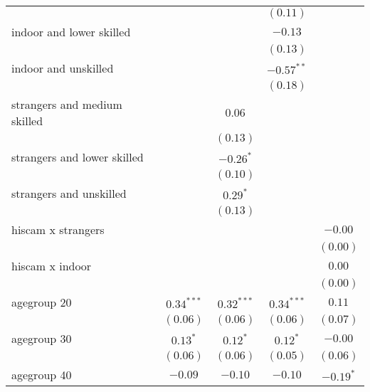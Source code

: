\begin{table}
\begin{center}
\begin{tabular}{l c c c c}
                             &               &               & $(0.11)$      &              \\
indoor and lower skilled     &               &               & $-0.13$       &              \\
                             &               &               & $(0.13)$      &              \\
indoor and unskilled         &               &               & $-0.57^{**}$  &              \\
                             &               &               & $(0.18)$      &              \\
strangers and medium skilled &               & $0.06$        &               &              \\
                             &               & $(0.13)$      &               &              \\
strangers and lower skilled  &               & $-0.26^{*}$   &               &              \\
                             &               & $(0.10)$      &               &              \\
strangers and unskilled      &               & $0.29^{*}$    &               &              \\
                             &               & $(0.13)$      &               &              \\
hiscam x strangers           &               &               &               & $-0.00$      \\
                             &               &               &               & $(0.00)$     \\
hiscam x indoor              &               &               &               & $0.00$       \\
                             &               &               &               & $(0.00)$     \\
agegroup 20                  & $0.34^{***}$  & $0.32^{***}$  & $0.34^{***}$  & $0.11$       \\
                             & $(0.06)$      & $(0.06)$      & $(0.06)$      & $(0.07)$     \\
agegroup 30                  & $0.13^{*}$    & $0.12^{*}$    & $0.12^{*}$    & $-0.00$      \\
                             & $(0.06)$      & $(0.06)$      & $(0.05)$      & $(0.06)$     \\
agegroup 40                  & $-0.09$       & $-0.10$       & $-0.10$       & $-0.19^{*}$  \\

\end{tabular}
\end{center}
\end{table}
